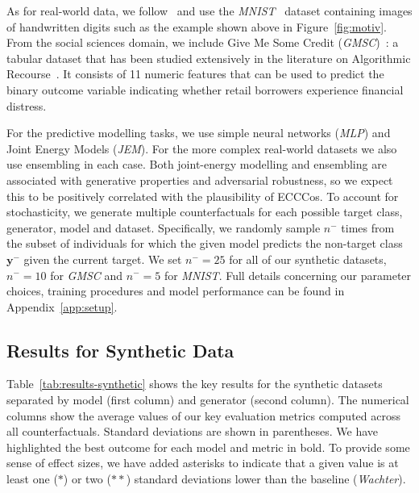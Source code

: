 \documentclass{article}
\begin{document}
As for real-world data, we follow~\citet{schut2021generating} and use the \textit{MNIST}~\citep{lecun1998mnist} dataset containing images of handwritten digits such as the example shown above in Figure~\ref{fig:motiv}. From the social sciences domain, we include Give Me Some Credit (\textit{GMSC})~\citep{kaggle2011give}: a tabular dataset that has been studied extensively in the literature on Algorithmic Recourse~\citep{pawelczyk2021carla}. It consists of 11 numeric features that can be used to predict the binary outcome variable indicating whether retail borrowers experience financial distress. 

For the predictive modelling tasks, we use simple neural networks (\textit{MLP}) and Joint Energy Models (\textit{JEM}). For the more complex real-world datasets we also use ensembling in each case. Both joint-energy modelling and ensembling are associated with generative properties and adversarial robustness, so we expect this to be positively correlated with the plausibility of ECCCos. To account for stochasticity, we generate multiple counterfactuals for each possible target class, generator, model and dataset. Specifically, we randomly sample $n^{-}$ times from the subset of individuals for which the given model predicts the non-target class $\mathbf{y}^{-}$ given the current target. We set $n^{-}=25$ for all of our synthetic datasets, $n^{-}=10$ for \textit{GMSC} and $n^{-}=5$ for \textit{MNIST}. Full details concerning our parameter choices, training procedures and model performance can be found in Appendix~\ref{app:setup}.

\subsection{Results for Synthetic Data}

Table~\ref{tab:results-synthetic} shows the key results for the synthetic datasets separated by model (first column) and generator (second column). The numerical columns show the average values of our key evaluation metrics computed across all counterfactuals. Standard deviations are shown in parentheses. We have highlighted the best outcome for each model and metric in bold. To provide some sense of effect sizes, we have added asterisks to indicate that a given value is at least one ($*$) or two ($**$) standard deviations lower than the baseline (\textit{Wachter}).
\end{document}
